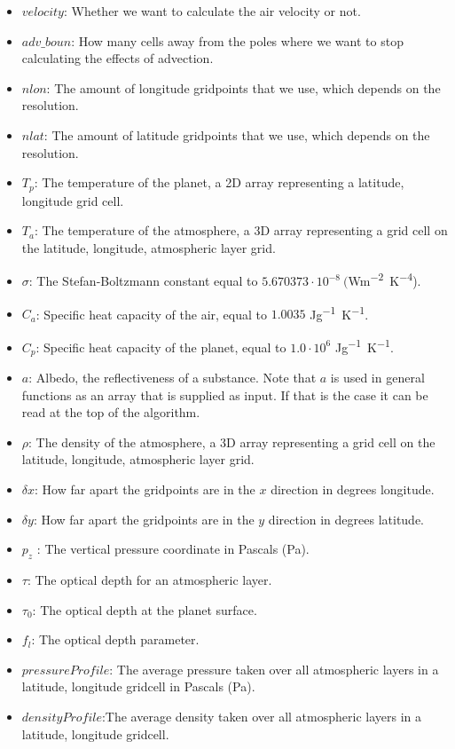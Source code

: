 \begin{itemize}
    \item $velocity$: Whether we want to calculate the air velocity or not.
    \item $adv\_boun$: How many cells away from the poles where we want to stop calculating the effects of advection.
    \item $nlon$: The amount of longitude gridpoints that we use, which depends on the resolution.
    \item $nlat$: The amount of latitude gridpoints that we use, which depends on the resolution.
    \item $T_p$: The temperature of the planet, a 2D array representing a latitude, longitude grid cell.
    \item $T_a$: The temperature of the atmosphere, a 3D array representing a grid cell on the latitude, longitude, atmospheric layer grid.
    \item $\sigma$: The Stefan-Boltzmann constant equal to $5.670373 \cdot 10^{-8} \ ($\si{Wm^{-2}K^{-4}}). 
    \item $C_a$: Specific heat capacity of the air, equal to $1.0035$ \si{Jg^{-1}K^{-1}}.
    \item $C_p$: Specific heat capacity of the planet, equal to $1.0 \cdot 10^{6}$ \si{Jg^{-1}K^{-1}}.
    \item $a$: Albedo, the reflectiveness of a substance. Note that $a$ is used in general functions as an array that is supplied as input. If that is the case it can be read at the top of the
                algorithm.
    \item $\rho$: The density of the atmosphere, a 3D array representing a grid cell on the latitude, longitude, atmospheric layer grid.
    \item $\delta x$: How far apart the gridpoints are in the $x$ direction in degrees longitude.
    \item $\delta y$: How far apart the gridpoints are in the $y$ direction in degrees latitude.
    \item $p_z$ : The vertical pressure coordinate in Pascals (\si{Pa}).
    \item $\tau$: The optical depth for an atmospheric layer.
    \item $\tau_0$: The optical depth at the planet surface.
    \item $f_l$: The optical depth parameter.
    \item $pressureProfile$: The average pressure taken over all atmospheric layers in a latitude, longitude gridcell in Pascals (\si{Pa}).
    \item $densityProfile$:The average density taken over all atmospheric layers in a latitude, longitude gridcell.

\end{itemize}
